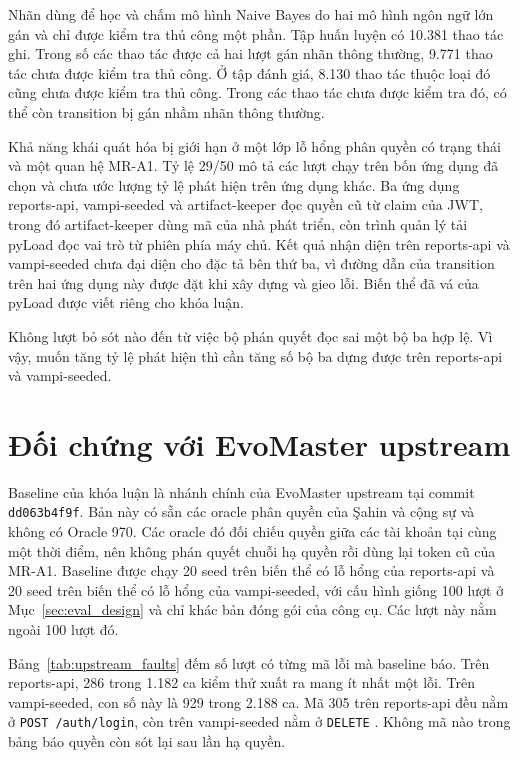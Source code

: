 Nhãn dùng để học và chấm mô hình Naive Bayes do hai mô hình ngôn ngữ lớn gán và chỉ được kiểm tra thủ công một phần. Tập huấn luyện có 10.381 thao tác ghi. Trong số các thao tác được cả hai lượt gán nhãn thông thường, 9.771 thao tác chưa được kiểm tra thủ công. Ở tập đánh giá, 8.130 thao tác thuộc loại đó cũng chưa được kiểm tra thủ công. Trong các thao tác chưa được kiểm tra đó, có thể còn transition bị gán nhầm nhãn thông thường.

Khả năng khái quát hóa bị giới hạn ở một lớp lỗ hổng phân quyền có trạng thái và một quan hệ MR-A1. Tỷ lệ 29/50 mô tả các lượt chạy trên bốn ứng dụng đã chọn và chưa ước lượng tỷ lệ phát hiện trên ứng dụng khác. Ba ứng dụng reports-api, vampi-seeded và artifact-keeper đọc quyền cũ từ claim của JWT, trong đó artifact-keeper dùng mã của nhà phát triển, còn trình quản lý tải pyLoad đọc vai trò từ phiên phía máy chủ. Kết quả nhận diện trên reports-api và vampi-seeded chưa đại diện cho đặc tả bên thứ ba, vì đường dẫn của transition trên hai ứng dụng này được đặt khi xây dựng và gieo lỗi. Biến thể đã vá của pyLoad được viết riêng cho khóa luận.

Không lượt bỏ sót nào đến từ việc bộ phán quyết đọc sai một bộ ba hợp lệ. Vì vậy, muốn tăng tỷ lệ phát hiện thì cần tăng số bộ ba dựng được trên reports-api và vampi-seeded.

\section{Đối chứng với EvoMaster upstream}
\label{sec:eval_baseline}

Baseline của khóa luận là nhánh chính của EvoMaster upstream tại commit \texttt{dd063b4f9f}. Bản này có sẵn các oracle phân quyền của Şahin và cộng sự \cite{sahin2024bola} và không có Oracle 970. Các oracle đó đối chiếu quyền giữa các tài khoản tại cùng một thời điểm, nên không phán quyết chuỗi hạ quyền rồi dùng lại token cũ của MR-A1. Baseline được chạy 20 seed trên biến thể có lỗ hổng của reports-api và 20 seed trên biến thể có lỗ hổng của vampi-seeded, với cấu hình giống 100 lượt ở Mục~\ref{sec:eval_design} và chỉ khác bản đóng gói của công cụ. Các lượt này nằm ngoài 100 lượt đó.

Bảng~\ref{tab:upstream_faults} đếm số lượt có từng mã lỗi mà baseline báo. Trên reports-api, 286 trong 1.182 ca kiểm thử xuất ra mang ít nhất một lỗi. Trên vampi-seeded, con số này là 929 trong 2.188 ca. Mã 305 trên reports-api đều nằm ở \texttt{POST /auth/login}, còn trên vampi-seeded nằm ở \texttt{DELETE} . Không mã nào trong bảng báo quyền còn sót lại sau lần hạ quyền.

